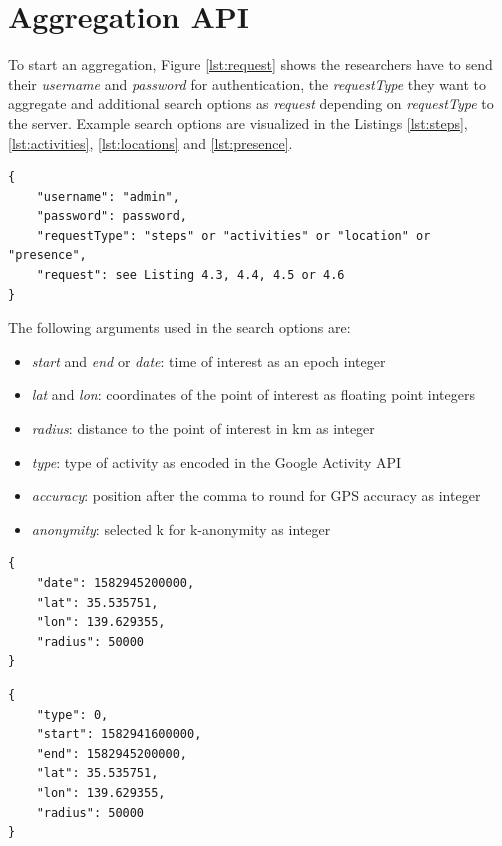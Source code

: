 \section{Aggregation API}

To start an aggregation, Figure \ref{lst:request} shows the researchers have to send their \textit{username} and \textit{password} for authentication, the \textit{requestType} they want to aggregate and additional search options as \textit{request} depending on \textit{requestType} to the server. Example search options are visualized in the Listings \ref{lst:steps}, \ref{lst:activities}, \ref{lst:locations} and \ref{lst:presence}.

\begin{lstlisting}[caption=Initial aggregation request from researcher, label={lst:request}]
{
    "username": "admin",
    "password": password,
    "requestType": "steps" or "activities" or "location" or "presence",
    "request": see Listing 4.3, 4.4, 4.5 or 4.6
}
\end{lstlisting}

The following arguments used in the search options are:
\begin{itemize}
    \item \textit{start} and \textit{end} or \textit{date}: time of interest as an epoch integer
    \item \textit{lat} and \textit{lon}: coordinates of the point of interest as floating point integers
    \item \textit{radius}: distance to the point of interest in km as integer
    \item \textit{type}: type of activity as encoded in the Google Activity API \cite{detectedactivity}
    \item \textit{accuracy}: position after the comma to round for GPS accuracy as integer
    \item \textit{anonymity}: selected k for k-anonymity as integer
\end{itemize}

\begin{lstlisting}[caption=Search options for steps, label={lst:steps}]
{
    "date": 1582945200000,
    "lat": 35.535751,
    "lon": 139.629355,
    "radius": 50000
}
\end{lstlisting}

\begin{lstlisting}[caption=Search options for activities, label={lst:activities}]
{
    "type": 0,
    "start": 1582941600000,
    "end": 1582945200000,
    "lat": 35.535751,
    "lon": 139.629355,
    "radius": 50000
}
\end{lstlisting}

